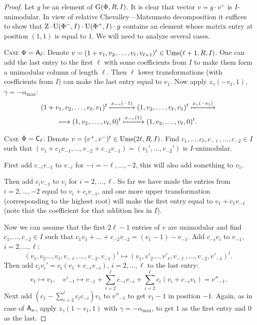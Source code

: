 \begin{proof}
Let $g$ be an element of $\operatorname{G}(\Phi, R, I)$. It is clear that vector $v=g\cdot v^+$ is $I$-unimodular.
In view of relative Chevalley---Matsumoto decomposition it suffices to show that $\operatorname{Z} \cdot \operatorname{U}(\Phi^-, I) \cdot \operatorname{U}(\Phi^+, I) \cdot g$ contains an element whose matrix entry at position $(1,1)$ is equal to $1$.
We will need to analyze several cases.

\textsc{Case $\Phi=\mathsf{A}_\ell$:}
Denote $v=(1+v_1,v_2,\ldots,v_\ell,v_{\ell+1})^t\in\operatorname{Ums}(\ell+1,R,I)$.
One can add the last entry to the first $\ell$ with some coefficients from $I$ to make them form a unimodular column of length $\ell$.
Then $\ell$ lower transformations (with coefficients from $I$) can make the last entry equal to $v_1$.
Now apply $z_\gamma(-v_1,1)$, $\gamma=-\alpha_{\max}$:
\begin{multline*}
(1+v_1,v_2,\ldots,v_\ell,v_1)^t\xmapsto{x_{-\gamma}(-1)}(1,v_2,\ldots,v_\ell,v_1)^t\xmapsto{x_\gamma(-v_1)}\\\longmapsto(1,v_2,\ldots,v_\ell,0)^t\xmapsto{x_{-\gamma}(1)}(1,v_2,\ldots,v_\ell,0)^t.
\end{multline*}

\textsc{Case $\Phi=\mathsf{C}_\ell$:}
Denote $v=(v^+,v^-)^t\in\operatorname{Ums}(2\ell,R,I)$. 
Find $c_1,\ldots, c_\ell, c_{-\ell},\ldots, c_{-2}\in I$ such that $(v_1+c_1v_{-1},\ldots,v_{-2}+c_{-2}v_{-1})=(v_1',\ldots,v_{-2}')$ is $I$-unimodular.

First add $c_{-i}v_{-1}$ to $v_{-i}$ for $-i=-\ell,\ldots,-2$, this will also add something to $v_1$.

Then add $c_iv_{-1}$ to $v_i$ for $i=2,\ldots,\ell$. So far we have made the entries from $i=2,\ldots,-2$ equal to $v_i+c_iv_{-1}$, and one more upper transformation (corresponding to the highest root) will make the first entry equal to $v_1+c_1v_{-1}$ (note that the coefficient for that addition lies in $I$).

Now we can assume that the first $2\ell-1$ entries of $v$ are unimodular and find $c_1,\ldots,c_{-2}\in I$ such that $c_1v_1+\ldots+c_{-2}v_{-2}=(v_1-1)-v_{-1}$. Add $c_{-i}v_i$ to $v_{-1}$, $i=2,\ldots,\ell$:
\[ (v_1,v_2\ldots,v_\ell,v_{-\ell},\ldots,v_{-2},v_{-1})^t\longmapsto (v_1,v'_2\ldots,v'_\ell,v_{-\ell},\ldots,v_{-2},v'_{-1})^t. \]
Then add $c_iv_i'=c_i(v_1+c_{-i}v_{-i})$, $i=2,\ldots,\ell$ to the last entry:
\[ v_1\longmapsto v_1,\quad v'_{-1}\longmapsto v_{-1}+\sum_{i=2}^\ell c_{-i}v_{-i}+\sum_{i=2}^\ell c_i(v_i+c_{-i}v_1)=v''_{-1}. \]
Next add $\left(c_1-\sum_{i=2}^\ell c_ic_{-i}\right)v_1$ to $v''_{-1}$ to get $v_1-1$ in position $-1$.
Again, as in case of $\mathsf{A}_n$, apply $z_\gamma(1-v_1,1)$ with $\gamma=-\alpha_\mathrm{max}$, to get $1$ as the first entry and $0$ as the last.


\end{proof}
